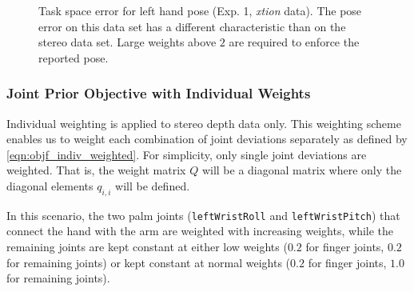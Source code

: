 \begin{figure}[h]
\centering
{}
%
\caption[Task space error (Exp. 1, xtion)]{Task space error for left hand pose (Exp. 1, \textit{xtion} data). The pose error on this data set has a different characteristic than on the stereo data set. Large weights above $2$ are required to enforce the reported pose.}
\label{fig:xtion_hand_pose_error}
\end{figure}

\subsubsection{Joint Prior Objective with Individual Weights}

Individual weighting is applied to stereo depth data only. This weighting scheme enables us to weight each combination of joint deviations separately as defined by \cref{eqn:objf_indiv_weighted}. For simplicity, only single joint deviations are weighted. That is, the weight matrix $Q$ will be a diagonal matrix where only the diagonal elements $q_{i,i}$ will be defined.

In this scenario, the two palm joints (\texttt{leftWristRoll} and \texttt{leftWristPitch}) that connect the hand with the arm are weighted with increasing weights, while the remaining joints are kept constant at either low weights ($0.2$ for finger joints, $0.2$ for remaining joints) or kept constant at normal weights ($0.2$ for finger joints, $1.0$ for remaining joints).

